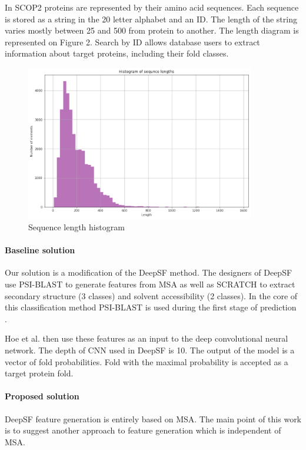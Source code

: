 \documentclass[12pt, twoside]{article}
\begin{document}
In SCOP2 proteins are represented by their amino acid sequences. Each sequence is stored as a string in the 20 letter alphabet and an ID. The length of the string varies mostly between 25 and 500 from protein to another. The length diagram is represented on Figure 2. Search by ID allows database users to extract information about target proteins, including their fold classes. 

\begin{figure}[htp]
    \centering
    \includegraphics[width=10cm]{figures/figure4.pdf}
    \caption{Sequence length histogram}
\end{figure}


\paragraph{Baseline solution}
\noindent
Our solution is a modification of the DeepSF \cite{DeepSF} method. The designers of DeepSF use PSI-BLAST\cite{PSIBLAST} to generate features from MSA  as well as SCRATCH \cite{SCRATCH} to extract secondary structure (3 classes) and solvent accessibility (2 classes).  In the core of this classification method PSI-BLAST is used during the first stage of prediction \cite{SCRATCH}. 

Hoe et al. then use these features as an input to the deep convolutional neural network. The depth of CNN used in DeepSF is 10. The output of the model is a vector of fold probabilities. Fold with the maximal probability is accepted as a target protein fold. 

\paragraph{Proposed solution}
\noindent

DeepSF feature generation is entirely based on MSA. The main point of this work is to suggest another approach to feature generation which is independent of MSA. 
\end{document}
